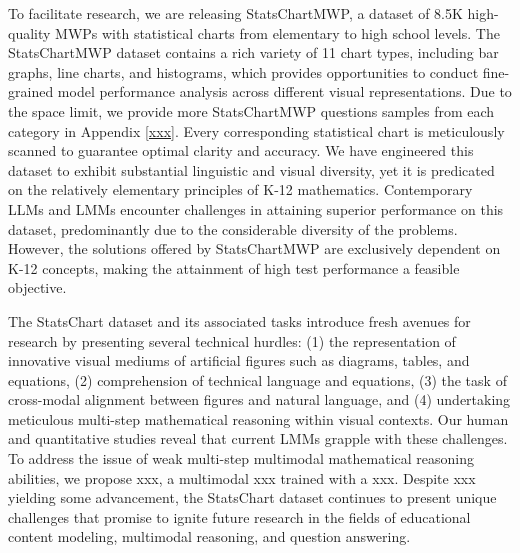 To facilitate research, we are releasing StatsChartMWP, a dataset of 8.5K high-quality MWPs with statistical charts from elementary to high school levels. The StatsChartMWP dataset contains a rich variety of 11 chart types, including bar graphs, line charts, and histograms, which provides opportunities to conduct fine-grained model performance analysis across different visual representations. Due to the space limit, we provide more StatsChartMWP questions samples from each category in Appendix \ref{xxx}. Every corresponding statistical chart is meticulously scanned to guarantee optimal clarity and accuracy. We have engineered this dataset to exhibit substantial linguistic and visual diversity, yet it is predicated on the relatively elementary principles of K-12 mathematics. Contemporary LLMs and LMMs encounter challenges in attaining superior performance on this dataset, predominantly due to the considerable diversity of the problems. However, the solutions offered by StatsChartMWP are exclusively dependent on K-12 concepts, making the attainment of high test performance a feasible objective.








The StatsChart dataset and its associated tasks introduce fresh avenues for research by presenting several technical hurdles: (1) the representation of innovative visual mediums of artificial figures such as diagrams, tables, and equations, (2) comprehension of technical language and equations, (3) the task of cross-modal alignment between figures and natural language, and (4) undertaking meticulous multi-step mathematical reasoning within visual contexts. Our human and quantitative studies reveal that current LMMs grapple with these challenges. To address the issue of weak multi-step multimodal mathematical reasoning abilities, we propose xxx, a multimodal xxx trained with a xxx. Despite xxx yielding some advancement, the StatsChart dataset continues to present unique challenges that promise to ignite future research in the fields of educational content modeling, multimodal reasoning, and question answering.





